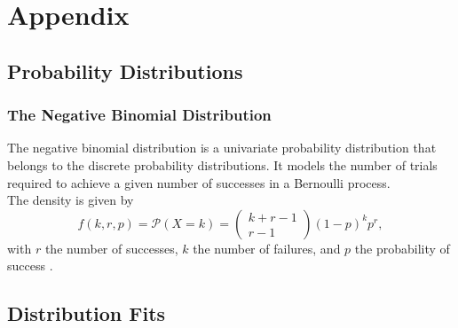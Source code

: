 %
\chapter{Appendix}
\label{sec:appendix}
\section{Probability Distributions}
\subsection{The Negative Binomial Distribution}
The negative binomial distribution is a univariate probability distribution that belongs to the discrete probability distributions. It models the number of trials required to achieve a given number of successes in a Bernoulli process. \\
The density is given by
\begin{equation}
    f\left(k,r,p\right)=\mathcal{P}\left(X=k\right)=\begin{pmatrix} k+r-1\\r-1\end{pmatrix}\left(1-p\right)^kp^r,
\end{equation}
with $r$ the number of successes, $k$ the number of failures, and $p$ the probability of success \cite{haldane1941fitting}.
\clearpage
\section{Distribution Fits}
